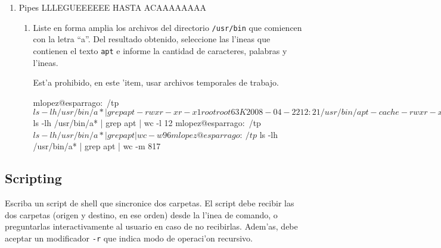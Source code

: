\begin{enumerate}
\item Pipes   LLLEGUEEEEEE HASTA ACAAAAAAAA

\begin{enumerate}

\item Liste en forma amplia los archivos del directorio \texttt{/usr/bin} que comiencen con la letra ``a''.
Del resultado obtenido, seleccione las l'ineas que contienen el texto \texttt{apt} e informe la cantidad de caracteres,
palabras y l'ineas.

Est'a prohibido, en este 'item, usar archivos temporales de trabajo.

\begin{envCodigo}
mlopez@esparrago:~/tp$ ls -lh /usr/bin/a* | grep apt
-rwxr-xr-x 1 root root  63K 2008-04-22 12:21 /usr/bin/apt-cache
-rwxr-xr-x 1 root root  18K 2008-04-22 12:21 /usr/bin/apt-cdrom
-rwxr-xr-x 1 root root 9.9K 2008-04-22 12:21 /usr/bin/apt-config
-rwxr-xr-x 1 root root  22K 2008-04-22 12:21 /usr/bin/apt-extracttemplates
-rwxr-xr-x 1 root root 187K 2008-04-22 12:21 /usr/bin/apt-ftparchive
-rwxr-xr-x 1 root root 139K 2008-04-22 12:21 /usr/bin/apt-get
-rwxr-xr-x 1 root root 2.2M 2008-04-04 06:56 /usr/bin/aptitude
-rwxr-xr-x 1 root root 1.9K 2008-04-04 06:56 /usr/bin/aptitude-create-state-bundle
-rwxr-xr-x 1 root root 3.0K 2008-04-04 06:56 /usr/bin/aptitude-run-state-bundle
-rwxr-xr-x 1 root root 5.0K 2008-04-22 12:20 /usr/bin/apt-key
-rwxr-xr-x 1 root root 2.2K 2008-04-22 12:20 /usr/bin/apt-mark
-rwxr-xr-x 1 root root  26K 2008-04-22 12:21 /usr/bin/apt-sortpkgs
mlopez@esparrago:~/tp$ ls -lh /usr/bin/a* | grep apt | wc -l
12
mlopez@esparrago:~/tp$ ls -lh /usr/bin/a* | grep apt | wc -w
96
mlopez@esparrago:~/tp$ ls -lh /usr/bin/a* | grep apt | wc -m
817
\end{envCodigo}

\end{enumerate}

\end{enumerate}

\subsection{Scripting}

Escriba un script de shell que sincronice dos carpetas. El script debe recibir las dos carpetas (origen y destino, en ese
orden) desde la l'inea de comando, o preguntarlas interactivamente al usuario en caso de no recibirlas. Adem'as, debe
aceptar un modificador \texttt{-r} que indica modo de operaci'on recursivo.

